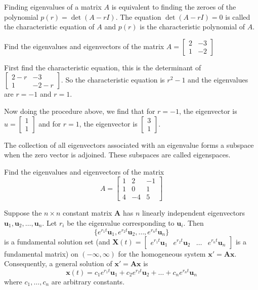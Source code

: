 \documentclass[../diffeq.tex]{subfiles}
\begin{document}
Finding eigenvalues of a matrix $A$ is equivalent to finding the zeroes of the polynomial $p(r)=\det (A-rI)$. The equation $\det (A-rI)=0$ is called the characteristic equation of $A$ 
and $p(r)$ is the characteristic polynomial of $A$.

\begin{example}
    Find the eigenvalues and eigenvectors of the matrix $A=\begin{bmatrix}
        2 & -3\\
        1 & -2
    \end{bmatrix}$

    First find the characteristic equation, this is the determinant of $\begin{bmatrix}
        2-r & -3\\
        1 & -2-r
    \end{bmatrix}$. So the characteristic equation is $r^2-1$ and the eigenvalues are $r=-1$ and $r=1$.

    Now doing the procedure above, we find that for $r=-1$, the eigenvector is $u=\begin{bmatrix}
        1\\1
    \end{bmatrix}$ and for $r=1$, the eigenvector is $\begin{bmatrix}
        3\\1
    \end{bmatrix}$.
\end{example}
The collection of all eigenvectors associated with an eigenvalue forms a subspace when the zero vector is adjoined. These subspaces are called eigenspaces.

\ex Find the eigenvalues and eigenvectors of the matrix 
\[A = \begin{bmatrix} 
    1 & 2 & -1 \\
    1 & 0 & 1\\
    4 & -4 & 5
    \end{bmatrix}\]

\begin{theorem}
    Suppose the $n\times n$ constant matrix $\textbf{A}$ has $n$ linearly independent eigenvectors $\textbf{u}_1,\textbf{u}_2,\dots,\textbf{u}_n$. Let $r_i$ be the eigenvalue corresponding to $\textbf{u}_i$. Then 
    \[ \{ e^{r_1t}\textbf{u}_1,e^{r_2t}\textbf{u}_2,\dots,e^{r_nt}\textbf{u}_n \} \]
    is a fundamental solution set (and $\textbf{X}(t)=\begin{bmatrix}
        e^{r_1t}\textbf{u}_1 & e^{r_2t}\textbf{u}_2 & \dots & e^{r_nt}\textbf{u}_n
    \end{bmatrix}$ is a fundamental matrix) on $(-\infty,\infty)$ for the homogeneous system $\textbf{x}'=\textbf{Ax}$. Consequently, a general solution of $\textbf{x}'=\textbf{Ax}$ is 
    \[ \textbf{x}(t)=c_1e^{r_1t}\textbf{u}_1+c_2e^{r_2t}\textbf{u}_2+\dots + c_ne^{r_nt}\textbf{u}_n \]
    where $c_1,\dots,c_n$ are arbitrary constants.
\end{theorem}
\end{document}
